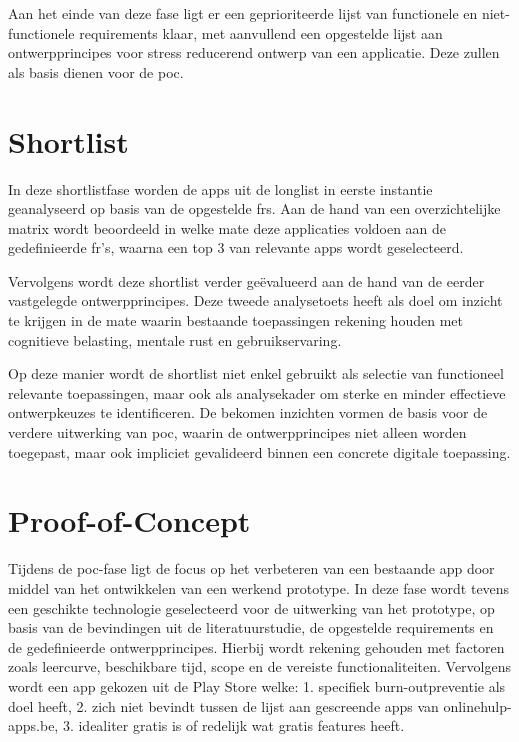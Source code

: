 \vspace{1em}

Aan het einde van deze fase ligt er een geprioriteerde lijst van functionele en niet-functionele requirements klaar, met aanvullend een opgestelde lijst aan ontwerpprincipes voor stress reducerend ontwerp van een applicatie. Deze zullen als basis dienen voor de \acrlong{poc}.



\section{Shortlist}
\label{sec:short-list}

\vspace{1em}

In deze shortlistfase worden de apps uit de longlist in eerste instantie geanalyseerd op basis van de opgestelde \acrlong{fr}s. Aan de hand van een overzichtelijke matrix wordt beoordeeld in welke mate deze applicaties voldoen aan de gedefinieerde \acrshort{fr}'s, waarna een top 3 van relevante apps wordt geselecteerd.

\vspace{1em}

Vervolgens wordt deze shortlist verder geëvalueerd aan de hand van de eerder vastgelegde ontwerpprincipes. Deze tweede analysetoets heeft als doel om inzicht te krijgen in de mate waarin bestaande toepassingen rekening houden met cognitieve belasting, mentale rust en gebruikservaring.

\vspace{1em}

Op deze manier wordt de shortlist niet enkel gebruikt als selectie van functioneel relevante toepassingen, maar ook als analysekader om sterke en minder effectieve ontwerpkeuzes te identificeren. De bekomen inzichten vormen de basis voor de verdere uitwerking van \acrlong{poc}, waarin de ontwerpprincipes niet alleen worden toegepast, maar ook impliciet gevalideerd binnen een concrete digitale toepassing.




\section{Proof-of-Concept}
\label{sec:poc}

\vspace{1em}

Tijdens de \acrlong{poc}-fase ligt de focus op het verbeteren van een bestaande app door middel van het ontwikkelen van een werkend prototype. In deze fase wordt tevens een geschikte technologie geselecteerd voor de uitwerking van het prototype, op basis van de bevindingen uit de literatuurstudie, de opgestelde requirements en de gedefinieerde ontwerpprincipes. Hierbij wordt rekening gehouden met factoren zoals leercurve, beschikbare tijd, scope en de vereiste functionaliteiten. Vervolgens wordt een app gekozen uit de Play Store welke: 1. specifiek burn-outpreventie als doel heeft, 2. zich niet bevindt tussen de lijst aan gescreende apps van onlinehulp-apps.be, 3. idealiter gratis is of redelijk wat gratis features heeft.

